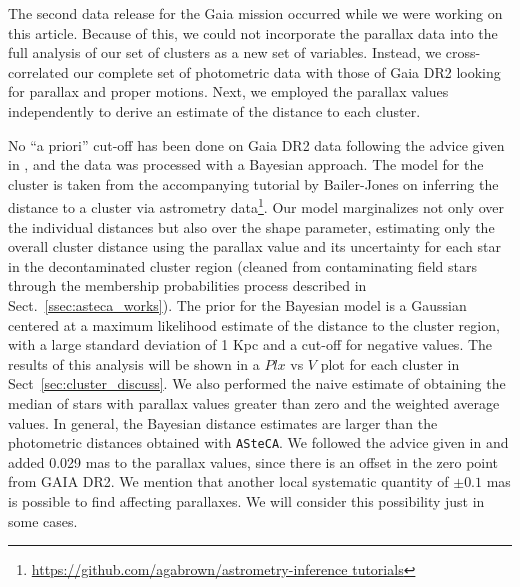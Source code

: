 \documentclass{aa}
\begin{document}
The second data release for the Gaia mission \citep{GaiaDR2_2018} occurred while
we were working on this article. Because of this, we could not incorporate the
parallax data into the full analysis of our set of clusters as a new set of
variables. Instead, we cross-correlated our complete set of photometric data
with those of Gaia DR2 looking for parallax and proper motions. Next, we
employed the parallax values independently to derive an estimate of the distance
to each cluster.

No ``a priori'' cut-off has been done on Gaia DR2 data
following the advice given in \cite{Luri_2018}, and the data was processed with
a Bayesian approach. The model for the cluster is taken from the accompanying
tutorial by Bailer-Jones on inferring the distance to a cluster via astrometry
data\footnote{\url{https://github.com/agabrown/astrometry-inference tutorials}}.
Our model marginalizes not only over the
individual distances but also over the shape parameter, estimating only the
overall cluster distance using the parallax value and its uncertainty for each
star in the decontaminated cluster region (cleaned from contaminating field
stars through the membership probabilities process described in
Sect.~\ref{ssec:asteca_works}).
The prior for the Bayesian model is a Gaussian centered at a maximum likelihood
estimate of the distance to the cluster region, with a large standard deviation
of 1 Kpc and a cut-off for negative values. The results of this analysis will
be shown in a $Plx$ vs $V$ plot for each cluster in
Sect~\ref{sec:cluster_discuss}. We also performed the naive
estimate of obtaining the median of stars with parallax values greater than zero
and the weighted average values. In general, the Bayesian distance estimates are
larger than the photometric distances obtained with \texttt{ASteCA}. We followed
the advice given in \cite{Lindegren_2018} and added 0.029 mas to the parallax
values, since there is an offset in the zero point from GAIA DR2. We mention
that another local systematic quantity of $\pm0.1$ mas is possible to find
affecting parallaxes. We will consider this possibility just in some cases.\\
\end{document}
